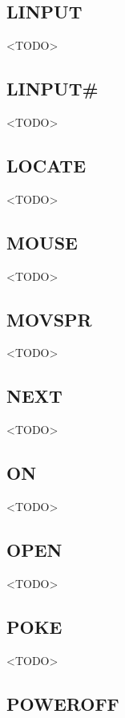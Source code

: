 \subsection{LINPUT}

<TODO>

\subsection{LINPUT\#}

<TODO>

\subsection{LOCATE}

<TODO>

\subsection{MOUSE}

<TODO>

\subsection{MOVSPR}

<TODO>

\subsection{NEXT}

<TODO>

\subsection{ON}

<TODO>

\subsection{OPEN}

<TODO>

\subsection{POKE}

<TODO>

\subsection{POWEROFF}

